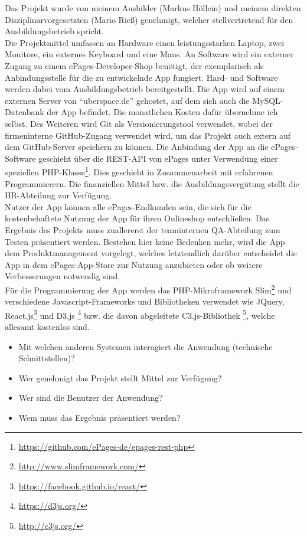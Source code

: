 Das Projekt wurde von meinem Ausbilder (Markus Höllein) und meinem direkten Disziplinarvorgesetzten (Mario Rieß) genehmigt, welcher stellvertretend für den Ausbildungsbetrieb spricht. \\
 Die Projektmittel umfassen an Hardware einen leistungsstarken Laptop, zwei Monitore, ein externes Keyboard und eine Maus. An Software wird ein externer Zugang zu einem ePages-Developer-Shop benötigt, der exemplarisch als Anbindungsstelle für die zu entwickelnde App fungiert. Hard- und Software werden dabei vom Ausbildungsbetrieb bereitgestellt. Die App wird auf einem externen Server von ``uberspace.de'' gehostet, auf dem sich auch die MySQL-Datenbank der App befindet. Die monatlichen Kosten dafür übernehme ich selbst. Des Weiteren wird Git als Versionierungstool verwendet, wobei der firmeninterne GitHub-Zugang verwendet wird, um das Projekt auch extern auf dem GitHub-Server speichern zu können. Die Anbindung der App an die ePages-Software geschieht über die REST-API von ePages unter Verwendung einer speziellen PHP-Klasse\footnote{\url{https://github.com/ePages-de/epages-rest-php}}. Dies geschieht in Zusammenarbeit mit erfahrenen Programmierern. Die finanziellen Mittel bzw. die Ausbildungsvergütung stellt die HR-Abteilung zur Verfügung.\\
Nutzer der App können alle ePages-Endkunden sein, die sich für die kostenbehaftete Nutzung der App für ihren Onlineshop entschließen. Das Ergebnis des Projekts muss zuallererst der teaminternen QA-Abteilung zum Testen präsentiert werden. Bestehen hier keine Bedenken mehr, wird die App dem Produktmanagement vorgelegt, welches letztendlich darüber entscheidet die App in dem ePages-App-Store zur Nutzung anzubieten oder ob weitere Verbesserungen notwendig sind.\\
Für die Programmierung der App werden das PHP-Mikroframework Slim\footnote{\url{http://www.slimframework.com/}} und verschiedene Javascript-Frameworks und Bibliotheken verwendet wie JQuery, React.js\footnote{\url{https://facebook.github.io/react/}} und D3.js \footnote{\url{https://d3js.org/}} bzw. die davon abgeleitete C3.js-Bibliothek \footnote{\url{http://c3js.org/}}, welche allesamt kostenlos sind.

\begin{itemize}
	\item Mit welchen anderen Systemen interagiert die Anwendung (technische Schnittstellen)?
	\item Wer genehmigt das Projekt \bzw stellt Mittel zur Verfügung? 
	\item Wer sind die Benutzer der Anwendung?
	\item Wem muss das Ergebnis präsentiert werden?
\end{itemize}


